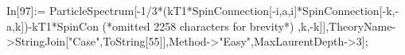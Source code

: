 In[97]:= ParticleSpectrum[-1/3*(kT1*SpinConnection[-i,a,i]*SpinConnection[-k,-a,k])-kT1*SpinCon (*omitted 2258 characters for brevity*) ,k,-k]],TheoryName->StringJoin["Case",ToString[55]],Method->"Easy",MaxLaurentDepth->3];